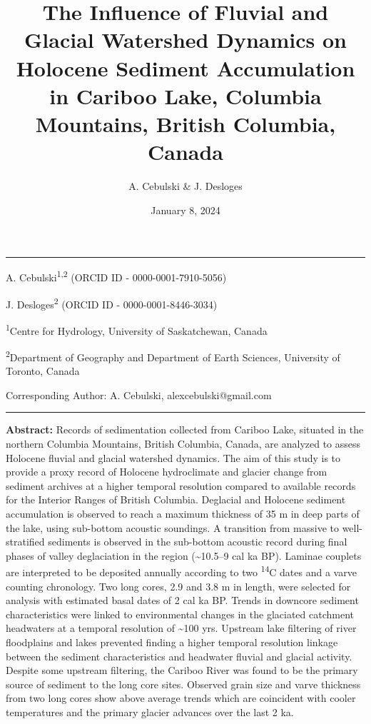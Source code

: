 \documentclass[
  letterpaper,
  DIV=11,
  numbers=noendperiod]{scrartcl}
\title{The Influence of Fluvial and Glacial Watershed Dynamics on
Holocene Sediment Accumulation in Cariboo Lake, Columbia Mountains,
British Columbia, Canada}
\author{A. Cebulski \& J. Desloges}
\date{January 8, 2024}
\begin{document}
\maketitle

\begin{center}\rule{0.5\linewidth}{0.5pt}\end{center}

A. Cebulski\textsuperscript{1,2} (ORCID ID - 0000-0001-7910-5056)

J. Desloges\textsuperscript{2} (ORCID ID - 0000-0001-8446-3034)

\textsuperscript{1}Centre for Hydrology, University of Saskatchewan,
Canada

\textsuperscript{2}Department of Geography and Department of Earth
Sciences, University of Toronto, Canada

Corresponding Author: A. Cebulski, alexcebulski@gmail.com

\begin{center}\rule{0.5\linewidth}{0.5pt}\end{center}

\pagebreak

\textbf{Abstract:} Records of sedimentation collected from Cariboo Lake,
situated in the northern Columbia Mountains, British Columbia, Canada,
are analyzed to assess Holocene fluvial and glacial watershed dynamics.
The aim of this study is to provide a proxy record of Holocene
hydroclimate and glacier change from sediment archives at a higher
temporal resolution compared to available records for the Interior
Ranges of British Columbia. Deglacial and Holocene sediment accumulation
is observed to reach a maximum thickness of 35 m in deep parts of the
lake, using sub-bottom acoustic soundings. A transition from massive to
well-stratified sediments is observed in the sub-bottom acoustic record
during final phases of valley deglaciation in the region
(\textasciitilde10.5--9 cal ka BP). Laminae couplets are interpreted to
be deposited annually according to two \textsuperscript{14}C dates and a
varve counting chronology. Two long cores, 2.9 and 3.8 m in length, were
selected for analysis with estimated basal dates of 2 cal ka BP. Trends
in downcore sediment characteristics were linked to environmental
changes in the glaciated catchment headwaters at a temporal resolution
of \textasciitilde100 yrs. Upstream lake filtering of river floodplains
and lakes prevented finding a higher temporal resolution linkage between
the sediment characteristics and headwater fluvial and glacial activity.
Despite some upstream filtering, the Cariboo River was found to be the
primary source of sediment to the long core sites. Observed grain size
and varve thickness from two long cores show above average trends which
are coincident with cooler temperatures and the primary glacier advances
over the last 2 ka.
\end{document}
